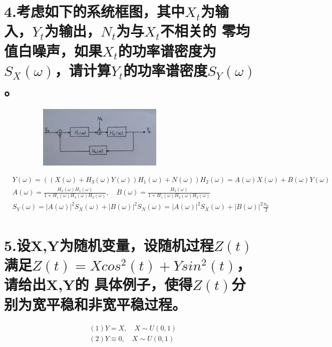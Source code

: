 \documentclass[UTF8]{ctexart}
\begin{document}
\section*{4.考虑如下的系统框图，其中$X_t$为输入，$Y_t$为输出，$N_t$为与$X_t$不相关的
  零均值白噪声，如果$X_t$的功率谱密度为$S_X(\omega)$，请计算$Y_t$的功率谱密度$S_Y(\omega)$。}
\begin{figure}[H]
  \centering
  \includegraphics[width=8cm,height=3cm]{4.jpg}
\end{figure}
\begin{equation*}
  \begin{aligned}
     & Y(\omega)=((X(\omega)+H_3(\omega)Y(\omega))H_1(\omega)+N(\omega))H_2(\omega)
    =A(\omega)X(\omega)+B(\omega)Y(\omega)                                           \\
     & A(\omega)=\frac{H_2(\omega)H_1(\omega)}{1+H_1(\omega)H_2(\omega)H_3(\omega)},
    \quad B(\omega)=\frac{H_2(\omega)}{1+H_1(\omega)H_2(\omega)H_3(\omega)}          \\
     & S_Y(\omega)=\lvert A(\omega)\rvert^2S_X(\omega)+\lvert B(\omega)\rvert^2
    S_N(\omega)=\lvert A(\omega)\rvert^2S_X(\omega)+\lvert B(\omega)\rvert^2
    \frac{n_0}{2}                                                                    \\
  \end{aligned}
\end{equation*}
\section*{5.设X,Y为随机变量，设随机过程$Z(t)$满足$Z(t)=Xcos^2(t)+Ysin^2(t)$，请给出X,Y的
  具体例子，使得$Z(t)$分别为宽平稳和非宽平稳过程。}
\begin{equation*}
  \begin{aligned}
     & (1)Y=X,\quad X\sim U(0,1)      \\
     & (2)Y\equiv0,\quad X\sim U(0,1) \\
  \end{aligned}
\end{equation*}
\end{document}
